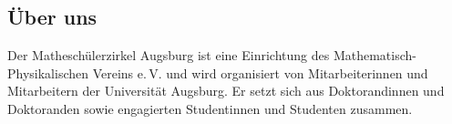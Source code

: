 \documentclass[12pt]{zettel}
\newcommand{\twopics}[2]{%
  \begin{figure}[b]%
    \vspace*{0.5cm}%
    \makebox[\textwidth][c]{%
      \texttt{[image: impressionen/\#1]}%
      \hspace*{1cm}%
      \texttt{[image: impressionen/\#2]}%
    }%
    \vspace*{-1cm}%
  \end{figure}
}
\begin{document}
% 
% 
% 
% 
% 
\subsection*{Über uns}

Der Matheschülerzirkel Augsburg ist eine Einrichtung des Mathematisch-Phy\-si\-ka\-li\-schen Vereins e.\,V. und wird organisiert von Mitarbeiterinnen und Mitarbeitern der Universität Augsburg. Er setzt sich aus Doktorandinnen und Doktoranden sowie engagierten Studentinnen und Studenten zusammen.
% 
\end{document}
